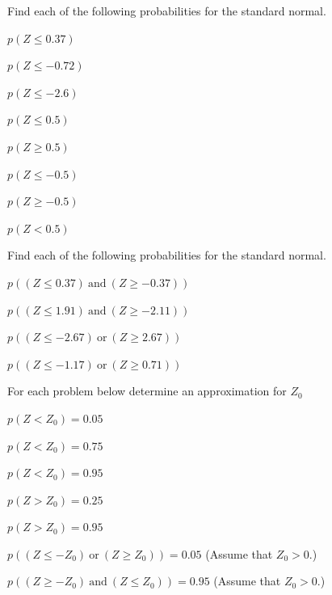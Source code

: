 \begin{problem}

  \item Find each of the following probabilities for the standard
    normal.
    \begin{subproblem}
      \item $p(Z \leq 0.37)$
        \vfill
      \item $p(Z \leq -0.72)$
        \vfill
      \item $p(Z \leq -2.6)$
        \vfill
      \item $p(Z \leq 0.5)$
        \vfill
      \item $p(Z \geq 0.5)$
        \vfill
      \item $p(Z \leq -0.5)$
        \vfill
      \item $p(Z \geq -0.5)$
        \vfill
      \item $p(Z < 0.5)$
        \vfill
    \end{subproblem}

    \clearpage

  \item Find each of the following probabilities for the standard
    normal.
    \begin{subproblem}
      \item $p((Z \leq 0.37) \mathrm{~and~} (Z \geq -0.37) )$
        \vfill
      \item $p((Z \leq 1.91) \mathrm{~and~} (Z \geq -2.11) )$
        \vfill
      \item $p((Z \leq -2.67) \mathrm{~or~} (Z \geq 2.67) )$
        \vfill
      \item $p((Z \leq -1.17) \mathrm{~or~} (Z \geq 0.71) )$
        \vfill
    \end{subproblem}

  \item For each problem below determine an approximation for $Z_0$
    \begin{subproblem}
      \item $p(Z < Z_0) = 0.05 $
        \vfill
      \item $p(Z < Z_0) = 0.75 $
        \vfill
      \item $p(Z < Z_0) = 0.95 $
        \vfill
      \item $p(Z > Z_0) = 0.25 $
        \vfill
      \item $p(Z > Z_0) = 0.95 $
        \vfill
      \item $p((Z \leq -Z_0) \mathrm{~or~} (Z \geq Z_0) ) = 0.05$
        (Assume that $Z_0>0$.)
        \vfill
      \item $p((Z \geq -Z_0) \mathrm{~and~} (Z \leq Z_0) ) = 0.95$
        (Assume that $Z_0>0$.)
        \vfill
    \end{subproblem}


\end{problem}
